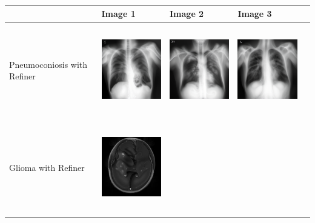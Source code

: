 
\begin{table}[H]
\centering
\begin{tabularx}{\linewidth}{@{}>{\centering\arraybackslash}m{3cm}>{\centering\arraybackslash}X>{\centering\arraybackslash}X>{\centering\arraybackslash}X>{\centering\arraybackslash}X@{}}
\toprule
 & Image 1 & Image 2 & Image 3 \\
\midrule
Pneumoconiosis with Refiner &
\includegraphics[valign=M,width=\linewidth,height=4cm,keepaspectratio]{main/content/images/sd_dreambooth/dreambooth_xl_v1/refiner/xray_0_ref.png} & 
\includegraphics[valign=M,width=\linewidth,height=4cm,keepaspectratio]{main/content/images/sd_dreambooth/dreambooth_xl_v1/refiner/xray_1_ref.png} & 
\includegraphics[valign=M,width=\linewidth,height=4cm,keepaspectratio]{main/content/images/sd_dreambooth/dreambooth_xl_v1/refiner/xray_2_ref.png} \\
\midrule
Glioma with Refiner &
\includegraphics[valign=M,width=\linewidth,height=4cm,keepaspectratio]{main/content/images/sd_dreambooth/dreambooth_xl_v1/refiner/glioma_0_ref.jpeg} & 

\end{tabularx}
\end{table}
